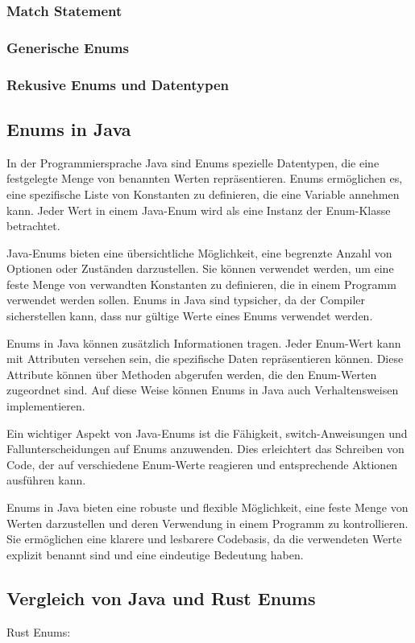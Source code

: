 \documentclass[a4paper, 1ppt]{article}
\begin{document}
\subsubsection{Match Statement}
\subsubsection{Generische Enums}
\subsubsection{Rekusive Enums und Datentypen}
\subsection{Enums in Java}
In der Programmiersprache Java sind Enums spezielle Datentypen, die eine festgelegte Menge von benannten Werten repräsentieren. Enums ermöglichen es, eine spezifische Liste von Konstanten zu definieren, die eine Variable annehmen kann. Jeder Wert in einem Java-Enum wird als eine Instanz der Enum-Klasse betrachtet.

Java-Enums bieten eine übersichtliche Möglichkeit, eine begrenzte Anzahl von Optionen oder Zuständen darzustellen. Sie können verwendet werden, um eine feste Menge von verwandten Konstanten zu definieren, die in einem Programm verwendet werden sollen. Enums in Java sind typsicher, da der Compiler sicherstellen kann, dass nur gültige Werte eines Enums verwendet werden.

Enums in Java können zusätzlich Informationen tragen. Jeder Enum-Wert kann mit Attributen versehen sein, die spezifische Daten repräsentieren können. Diese Attribute können über Methoden abgerufen werden, die den Enum-Werten zugeordnet sind. Auf diese Weise können Enums in Java auch Verhaltensweisen implementieren.

Ein wichtiger Aspekt von Java-Enums ist die Fähigkeit, switch-Anweisungen und Fallunterscheidungen auf Enums anzuwenden. Dies erleichtert das Schreiben von Code, der auf verschiedene Enum-Werte reagieren und entsprechende Aktionen ausführen kann.

Enums in Java bieten eine robuste und flexible Möglichkeit, eine feste Menge von Werten darzustellen und deren Verwendung in einem Programm zu kontrollieren. Sie ermöglichen eine klarere und lesbarere Codebasis, da die verwendeten Werte explizit benannt sind und eine eindeutige Bedeutung haben.
\subsection{Vergleich von Java und Rust Enums}
Rust Enums:
\end{document}

